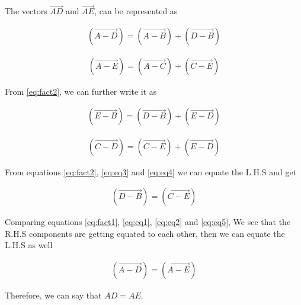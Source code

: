 \documentclass[journal,12pt,twocolumn]{IEEEtran}
\begin{document}
	The vectors $\vec{AD}$ and $\vec{AE}$, can be represented as 
	
	\begin{align} \label{eq:eq1}
		(\vec{A-D}) = (\vec{A-B}) + (\vec{D-B})
	\end{align}

	\begin{align} \label{eq:eq2}
		(\vec{A-E}) = (\vec{A-C}) + (\vec{C-E})
	\end{align}
	
	From \eqref{eq:fact2}, we can further write it as 
	
	\begin{align}\label{eq:eq3}
		(\vec{E-B}) = (\vec{D-B}) + (\vec{E-D})
	\end{align}

	\begin{align}\label{eq:eq4}
		(\vec{C-D}) = (\vec{C-E}) + (\vec{E-D})
	\end{align}
	
	From equations \eqref{eq:fact2}, \eqref{eq:eq3} and \eqref{eq:eq4} we can equate the L.H.S and get
	
	\begin{align}\label{eq:eq5}
		(\vec{D-B}) = (\vec{C-E})
	\end{align}
	
	Comparing equations \eqref{eq:fact1}, \eqref{eq:eq1}, \eqref{eq:eq2} and \eqref{eq:eq5}, We see that the R.H.S components are getting equated to each other, then we can equate the L.H.S as well
	
	\begin{align}
		(\vec{A-D}) = (\vec{A-E})
	\end{align}
	
	Therefore, we can say that $AD = AE$.
	
\end{document}
